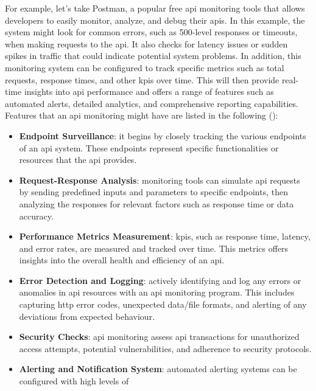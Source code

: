 \begin{multicols}{2}
For example, let's take Postman, a popular free \acrshort{api} monitoring tools that allows developers to easily
monitor, analyze, and debug their \acrshort{api}s. In this example, the system might look for common errors, such
as 500-level responses or timeouts, when making requests to the \acrshort{api}. It also checks for latency issues
or sudden spikes in traffic that could indicate potential system problems. In addition, this monitoring system can
be configured to track specific metrics such as total requests, response times, and other \acrshort{kpi}s over time.
This will then provide real-time insights into \acrshort{api} performance and offers a range of features such as
automated alerts, detailed analytics, and comprehensive reporting capabilities. Features that an \acrshort{api}
monitoring might have are listed in the following (\cite{postmanapimonitoring}):
\begin{itemize}
      \item \textbf{Endpoint Surveillance}: it begins by closely tracking the various endpoints of an \acrshort{api}
            system. These endpoints represent specific functionalities or resources that the \acrshort{api} provides.
      \item \textbf{Request-Response Analysis}: monitoring tools can simulate \acrshort{api} requests by sending
            predefined inputs and parameters to specific endpoints, then analyzing the responses for relevant factors
            such as response time or data accuracy.
      \item \textbf{Performance Metrics Measurement}: \acrshort{kpi}s, such as response time, latency, and error rates,
            are measured and tracked over time. This metrics offers insights into the overall health and efficiency of
            an \acrshort{api}.
      \item \textbf{Error Detection and Logging}: actively identifying and log any errors or anomalies in \acrshort{api}
            resources with an \acrshort{api} monitoring program. This includes capturing \acrshort{http} error codes,
            unexpected data/file formats, and alerting of any deviations from expected behaviour.
      \item \textbf{Security Checks}: \acrshort{api} monitoring assess \acrshort{api} transactions for unauthorized
            access attempts, potential vulnerabilities, and adherence to security protocols.
      \item \textbf{Alerting and Notification System}: automated alerting systems can be configured with high levels of

\end{itemize}
\end{multicols}
